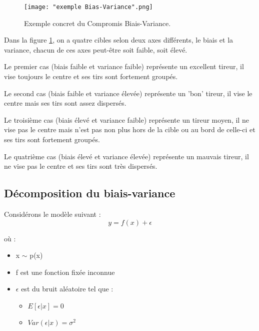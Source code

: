 \documentclass[a4paper]{article}
\begin{document}
\begin{figure}[!h]
	\centering
	\texttt{[image: "exemple Bias-Variance".png]}
	\caption{Exemple concret du Compromis Biais-Variance.} \cite{UnderstandingBiasVarianceTradeoff}
	\label{ConcreteExample}
\end{figure}

Dans la figure \ref{ConcreteExample}, on a quatre cibles selon deux axes différents, le biais et la variance, chacun de ces axes peut-être soit faible, soit élevé. \par

Le premier cas (biais faible et variance faible) représente un excellent tireur, il vise toujours le centre et ses tirs sont fortement groupés. \par

Le second cas (biais faible et variance élevée) représente un 'bon' tireur, il vise le centre mais ses tirs sont assez dispersés. \par

Le troisième cas (biais élevé et variance faible) représente un tireur moyen, il ne vise pas le centre mais n'est pas non plus hors de la cible ou au bord de celle-ci et ses tirs sont fortement groupés. \par

Le quatrième cas (biais élevé et variance élevée) représente un mauvais tireur, il ne vise pas le centre et ses tirs sont très dispersés. \par

\newpage

\subsection{Décomposition du biais-variance}
\label{decomposition_Biais_Variance_section}

Considérons le modèle suivant : 
\begin{equation}
\label{decomposition_Biais_Variance}
y = f(x) + \epsilon
\end{equation}

où : 

\begin{itemize}
	\item x $\sim$ p(x)
	\item f est une fonction fixée inconnue
	\item $\epsilon$ est du bruit aléatoire tel que :
	\begin{itemize}
		\item $E[\epsilon|x] = 0$
		\item $Var(\epsilon|x) = \sigma^2$
	\end{itemize}
\end{itemize}
\end{document}
